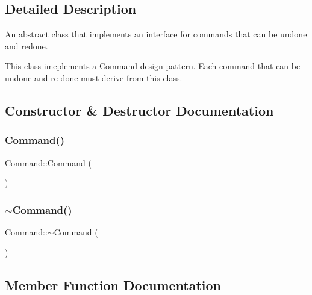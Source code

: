 \subsection{Detailed Description}
An abstract class that implements an interface for commands that can be undone and redone. 

This class imeplements a \mbox{\hyperlink{class_command}{Command}} design pattern. Each command that can be undone and re-\/done must derive from this class. 

\subsection{Constructor \& Destructor Documentation}
\mbox{\label{class_command_a18df2d81039392daeb0b78c346a70537}} 
\subsubsection{\texorpdfstring{Command()}{Command()}}
{\footnotesize\ttfamily Command\+::\+Command (\begin{DoxyParamCaption}{ }\end{DoxyParamCaption})}

\mbox{\label{class_command_ab552bb3a07fdd1acbfd8ea76e69b2278}} 
\subsubsection{\texorpdfstring{$\sim$Command()}{~Command()}}
{\footnotesize\ttfamily Command\+::$\sim$\+Command (\begin{DoxyParamCaption}{ }\end{DoxyParamCaption})\hspace{0.3cm}{\ttfamily [virtual]}}



\subsection{Member Function Documentation}
\mbox{\label{class_command_a5d83cdea649a79d7b7253196a6deddeb}} 
